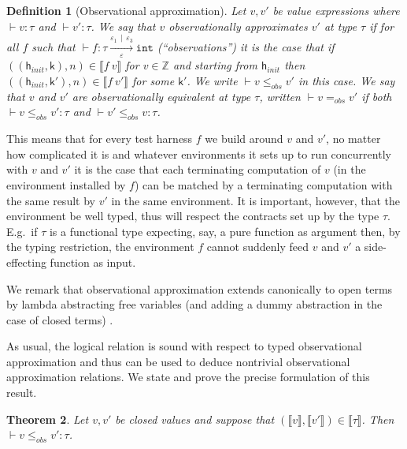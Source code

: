 \documentclass[nocopyrightspace,preprint]{sigplanconf}
\newcommand{\keywd}[1]{\mathtt{#1}}
\newcommand{\myeffto}[3]{\xrightarrow[#2]{#1\,\mid\, #3}}
\newcommand{\inttype}{\keywd{int}}
\newcommand{\eff}{\varepsilon}
\newcommand{\sem}[1]{\ensuremath{\llbracket {#1} \rrbracket}}
\newtheorem{theorem}{Theorem}[section]
\newtheorem{definition}[theorem]{Definition}
\newcommand\hinit{\ensuremath{\mathsf{h}_{\mathit{init}}}\xspace}
\renewcommand\k{\ensuremath{\mathsf{k}}\xspace}
\begin{document}
\begin{definition}[Observational approximation]
Let $v,v'$ be value expressions where $\vdash v:\tau$ and $\vdash
v':\tau$. We say that $v$ observationally approximates $v'$ at type
$\tau$ if for all $f$ such that $\vdash
f:\tau\myeffto{\eff_1}{\eff}{\eff_3} \inttype$ (``observations'') it
is the case that if $((\hinit,\k),n)\in\sem{f\ v}$ for
$v\in\mathbb{Z}$ and starting from $\hinit$ then $((\hinit,\k'),n)\in
\sem{f\ v'}$ for some $\k'$. We write $\vdash v\leq_{\mathit{obs}}v'$
in this case. We say that $v$ and $v'$ are observationally equivalent
at type $\tau$, written $\vdash v =_{\mathit{obs}}v'$ if both $\vdash
v\leq_{\mathit{obs}}v':\tau$ and $\vdash v'\leq_{\mathit{obs}}v:\tau$.
\end{definition} 
This means that for every test harness $f$ we build around $v$ and
$v'$, no matter how complicated it is and whatever environments it
sets up to run concurrently with $v$ and $v'$ it is the case that each
terminating computation of $v$ (in the environment installed by $f$)
can be matched by a terminating computation with the same result by
$v'$ in the same environment. It is important, however, that the
environment be well typed, thus will respect the contracts set up by
the type $\tau$. E.g.\ if $\tau$ is a functional type expecting, say,
a pure function as argument then, by the typing restriction, the
environment $f$ cannot suddenly feed $v$ and $v'$ a side-effecting
function as input.

We remark that observational approximation extends canonically to open
terms by lambda abstracting free variables (and adding a dummy
abstraction in the case of closed terms)
\cite{DBLP:dblp_conf/popl/Benton0N14}.

As usual, the logical relation is sound with respect to typed
observational approximation and thus can be used to deduce nontrivial
observational approximation relations. We state and prove the precise
formulation of this result.

\begin{theorem}
Let $v,v'$ be closed values and suppose that $(\sem{v},\sem{v'})\in\sem{\tau}$. 
Then $\vdash v\leq_{\mathit{obs}}v':\tau$. 
\end{theorem}
\end{document}
